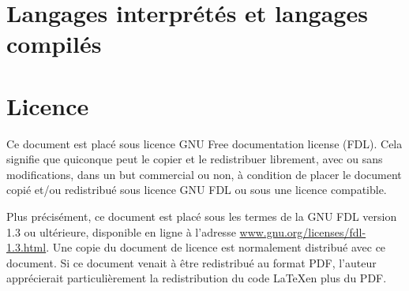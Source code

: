 \documentclass{article}
\begin{document}
\section{Langages interprétés et langages compilés}


\printbibliography

\section*{Licence}
Ce document est placé sous licence GNU Free documentation license (FDL).
Cela signifie que quiconque peut le copier et le redistribuer librement, avec ou
sans modifications, dans un but commercial ou non, à condition de placer le
document copié et/ou redistribué sous licence GNU FDL ou sous une licence
compatible.

Plus précisément, ce document est placé sous les termes de la GNU FDL version 1.3 ou
ultérieure, disponible en ligne à l’adresse
\href{www.gnu.org/licenses/fdl-1.3.html}{www.gnu.org/licenses/fdl-1.3.html}.
Une copie du document de licence est normalement distribué avec ce document.
Si ce document venait à être redistribué au format PDF, l’auteur apprécierait
particulièrement la redistribution du code \LaTeX\nobreakspace en plus du PDF.
\end{document}

